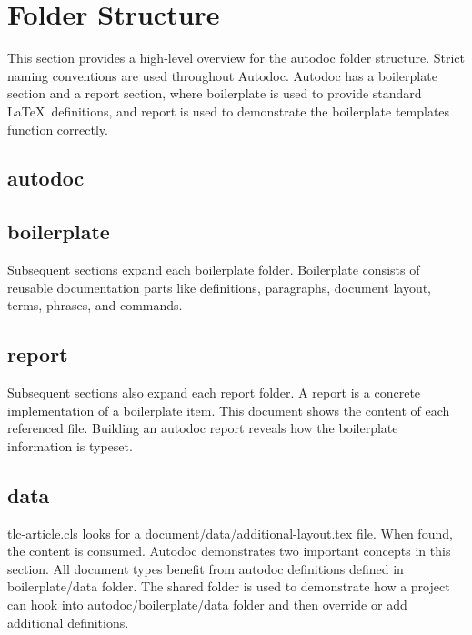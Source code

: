 
\clearpage
\section{Folder Structure} 
This section provides a high-level overview for the autodoc folder structure.
Strict naming conventions are used throughout Autodoc.  Autodoc has
a boilerplate section and a report section, where boilerplate is used to provide
standard \LaTeX\ definitions, and report is used to demonstrate the boilerplate templates
function correctly. 

\tlcVspace

\subsection{autodoc}
%

\subsection{boilerplate}
Subsequent sections expand each boilerplate folder.  Boilerplate consists of
reusable documentation parts like definitions, paragraphs, document layout,
terms, phrases, and commands.

\tlcVspace

%

\subsection{report}
Subsequent sections also expand each report folder.  A report is a concrete
implementation of a boilerplate item.  This document shows the content of each
referenced file.  Building an autodoc report reveals how the boilerplate
information is typeset. 

\tlcVspace


\clearpage
\subsection{data}
tlc-article.cls looks for a document/data/additional-layout.tex file.  When
found, the content is consumed.  Autodoc demonstrates two important concepts in
this section.  All document types benefit from autodoc definitions defined in
boilerplate/data folder.  The shared folder is used to demonstrate how a project
can hook into autodoc/boilerplate/data folder and then override or add
additional definitions. 

\tlcVspace

%

